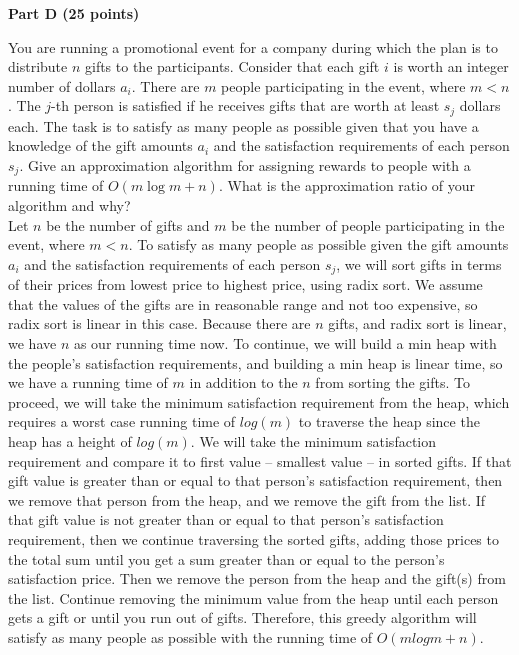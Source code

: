 \documentclass{article}
\begin{document}
\begin{center}
{\bf Part D (25 points)}
\end{center}

 You are running a promotional event for a
company during which the plan is to distribute $n$ gifts to the
participants. Consider that each gift $i$ is worth an integer number
of dollars $a_i$. There are $m$ people participating in the event,
where $m < n$. The $j$-th person is satisfied if he receives gifts
that are worth at least $s_j$ dollars each. The task is to satisfy as
many people as possible given that you have a knowledge of the gift
amounts $a_i$ and the satisfaction requirements of each person
$s_j$. Give an approximation algorithm for assigning rewards to people
with a running time of $O(m\log m+n)$. What is the approximation ratio
of your algorithm and why?\\

\noindent Let $n$ be the number of gifts and $m$ be the number of people participating in the event, where $m<n$. To satisfy as many people as possible given the gift amounts $a_i$ and the satisfaction requirements of each person $s_j$, we will sort gifts in terms of their prices from lowest price to highest price, using radix sort. We assume that the values of the gifts are in reasonable range and not too expensive, so radix sort is linear in this case. Because there are $n$ gifts, and radix sort is linear, we have $n$ as our running time now. To continue, we will build a min heap with the people's satisfaction requirements, and building a min heap is linear time, so we have a running time of $m$ in addition to the $n$ from sorting the gifts. To proceed, we will take the minimum satisfaction requirement from the heap, which requires a worst case running time of $log(m)$ to traverse the heap since the heap has a height of $log(m)$. We will take the minimum satisfaction requirement and compare it to first value -- smallest value -- in sorted gifts. If that gift value is greater than or equal to that person's satisfaction requirement, then we remove that person from the heap, and we remove the gift from the list. If that gift value is not greater than or equal to that person's satisfaction requirement, then we continue traversing the sorted gifts, adding those prices to the total sum until you get a sum greater than or equal to the person's satisfaction price. Then we remove the person from the heap and the gift(s) from the list. Continue removing the minimum value from the heap until each person gets a gift or until you run out of gifts. Therefore, this greedy algorithm will satisfy as many people as possible with the running time of $O(mlogm + n)$.
\end{document}
